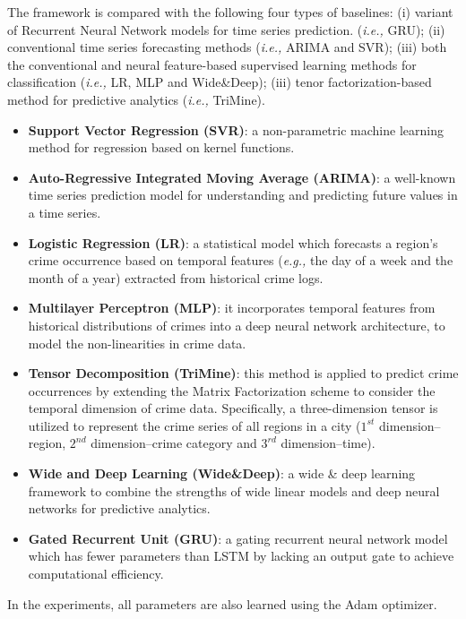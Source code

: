 The framework is compared with the following four
types of baselines: (i) variant of Recurrent Neural Network models for time series prediction. (\emph{i.e.,} GRU); (ii) conventional time
series forecasting methods (\emph{i.e.,} ARIMA and SVR); (iii) both the
conventional and neural feature-based supervised learning methods for classification (\emph{i.e.,} LR, MLP and Wide\&Deep); (iii) tenor
factorization-based method for predictive analytics (\emph{i.e.,} TriMine).
\begin{itemize}
    \item \textbf{Support Vector Regression (SVR)}: a non-parametric machine learning method for regression based on kernel functions.
    
    \item \textbf{Auto-Regressive Integrated Moving Average (ARIMA)}: a well-known time series prediction model for understanding
    and predicting future values in a time series.
    
    \item \textbf{Logistic Regression (LR)}:  a statistical model which forecasts a region’s crime occurrence based on temporal features
    (\emph{e.g.,} the day of a week and the month of a year) extracted from
    historical crime logs.
    
    \item \textbf{Multilayer Perceptron (MLP)}: it incorporates temporal features from historical distributions of crimes into a deep neural
    network architecture, to model the non-linearities in crime data.
    
    \item \textbf{Tensor Decomposition (TriMine)}: this method is applied
    to predict crime occurrences by extending the Matrix Factorization scheme to consider the temporal dimension of crime data.
    Specifically, a three-dimension tensor is utilized to represent the
    crime series of all regions in a city ($1^{st}$ dimension–region, $2^{nd}$
    dimension–crime category and $3^{rd}$ dimension–time).
    
    \item \textbf{Wide and Deep Learning (Wide\&Deep)}:  a wide \& deep
    learning framework to combine the strengths of wide linear
    models and deep neural networks for predictive analytics.
    
    \item \textbf{Gated Recurrent Unit (GRU)}:  a gating recurrent neural network model which has fewer parameters than LSTM by lacking
    an output gate to achieve computational efficiency.
\end{itemize}
In the experiments, all parameters are also learned using the Adam
optimizer.

